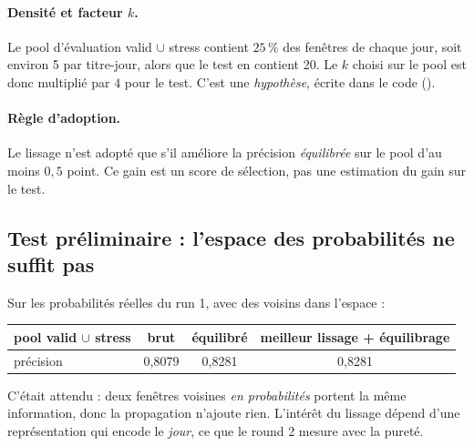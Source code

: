 \paragraph{Densité et facteur $k$.} Le pool d'évaluation valid $\cup$ stress contient $25\,\%$ des fenêtres de chaque jour, soit environ 5 par titre-jour, alors que le test en contient 20. Le $k$ choisi sur le pool est donc multiplié par $4$ pour le test. C'est une \emph{hypothèse}, écrite dans le code ().

\paragraph{Règle d'adoption.} Le lissage n'est adopté que s'il améliore la précision \emph{équilibrée} sur le pool d'au moins $0{,}5$ point. Ce gain est un score de sélection, pas une estimation du gain sur le test.

\subsection{Test préliminaire : l'espace des probabilités ne suffit pas}\label{sec:probaspace}
Sur les probabilités réelles du run 1, avec des voisins dans l'espace  :
\begin{center}\small
\begin{tabular}{lccc}
\toprule
pool valid $\cup$ stress & brut & équilibré & meilleur lissage + équilibrage\\
\midrule
précision & 0,8079 & 0,8281 & 0,8281\\
\bottomrule
\end{tabular}
\end{center}
C'était attendu : deux fenêtres voisines \emph{en probabilités} portent la même information, donc la propagation n'ajoute rien. L'intérêt du lissage dépend d'une représentation qui encode le \emph{jour}, ce que le round 2 mesure avec la pureté.

